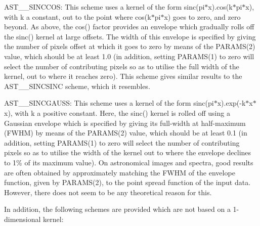 \documentclass[twoside,11pt]{article}
\begin{document}
{{{         \sstitem
         AST\_\_SINCCOS: This scheme uses a kernel of the form
         sinc(pi$*$x).cos(k$*$pi$*$x), with k a constant, out to the point where
         cos(k$*$pi$*$x) goes to zero, and zero beyond. As above, the cos() factor
         provides an envelope which gradually rolls off the sinc() kernel
         at large offsets. The width of this envelope is specified by giving
         the number of pixels offset at which it goes to zero by means
         of the PARAMS(2) value, which should be at least 1.0 (in addition,
         setting PARAMS(1) to zero will select the number of contributing
         pixels so as to utilise the full width of the kernel, out to where it
         reaches zero). This scheme gives similar results to the
         AST\_\_SINCSINC scheme, which it resembles.

         \sstitem
         AST\_\_SINCGAUSS: This scheme uses a kernel of the form
         sinc(pi$*$x).exp(-k$*$x$*$x), with k a positive constant. Here, the sinc()
         kernel is rolled off using a Gaussian envelope which is specified by
         giving its full-width at half-maximum (FWHM) by means of the PARAMS(2)
         value, which should be at least 0.1 (in addition, setting PARAMS(1)
         to zero will select the number of contributing pixels so as to utilise
         the width of the kernel out to where the envelope declines to 1\% of its
         maximum value). On astronomical images and spectra, good results are
         often obtained by approximately matching the FWHM of the
         envelope function, given by PARAMS(2), to the point spread function
         of the input data. However, there does not seem to be any theoretical
         reason for this.

      }
      In addition, the following schemes are provided which are not based
      on a 1-dimensional kernel:

      }}
\end{document}
